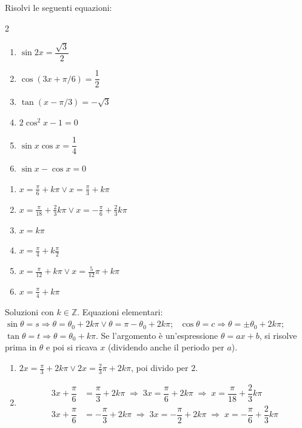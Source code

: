 \begin{question}[ID=4.4, subtitle={Equazioni goniometriche con duplicazione — serie 4}, tags={goniometria, equazioni goniometriche}, difficulty=media]
Risolvi le seguenti equazioni:
\begin{multicols}{2}
\begin{enumerate}
\item $\sin 2x = \dfrac{\sqrt{3}}{2}$
\item $\cos(3x + \pi/6) = \dfrac{1}{2}$
\item $\tan(x - \pi/3) = -\sqrt{3}$
\item $2 \cos^2 x - 1 = 0$
\item $\sin x \cos x = \dfrac{1}{4}$
\item $\sin x - \cos x = 0$
\end{enumerate}
\end{multicols}
\begin{solution}
\begin{enumerate}
    \item $x=\tfrac\pi6+k\pi \vee x=\tfrac\pi3+k\pi$
    \item $x=\tfrac\pi{18}+\tfrac23k\pi \vee x=-\tfrac\pi6+\tfrac23k\pi$
    \item $x=k\pi$
    \item $x=\tfrac\pi4+k\tfrac\pi2$
    \item $x=\tfrac\pi{12}+k\pi \vee x=\tfrac5{12}\pi+k\pi$
    \item $x=\tfrac\pi4+k\pi$
\end{enumerate}
\end{solution}
\begin{explanation}
Soluzioni con $k\in\mathbb{Z}$. Equazioni elementari: \ $\sin\theta=s \Rightarrow \theta=\theta_0+2k\pi \vee \theta=\pi-\theta_0+2k\pi$; \ $\cos\theta=c \Rightarrow \theta=\pm\theta_0+2k\pi$; \ $\tan\theta=t \Rightarrow \theta=\theta_0+k\pi$. Se l'argomento è un'espressione $\theta=ax+b$, si risolve prima in $\theta$ e poi si ricava $x$ (dividendo anche il periodo per $a$).
\begin{enumerate}
    \item $2x=\tfrac\pi3+2k\pi \vee 2x=\tfrac23\pi+2k\pi$, poi divido per $2$.
    \item \[\begin{aligned}
    3x+\dfrac\pi6 &= \dfrac\pi3+2k\pi \;\Rightarrow\; 3x=\dfrac\pi6+2k\pi \;\Rightarrow\; x=\dfrac\pi{18}+\dfrac23k\pi\\
    3x+\dfrac\pi6 &= -\dfrac\pi3+2k\pi \;\Rightarrow\; 3x=-\dfrac\pi2+2k\pi \;\Rightarrow\; x=-\dfrac\pi6+\dfrac23k\pi

\end{aligned}\]
\end{enumerate}
\end{explanation}
\end{question}
